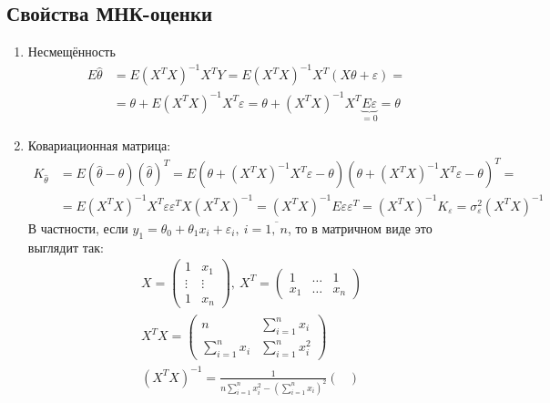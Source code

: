 \documentclass[12pt, a4paper]{article}
\begin{document}
\subsection*{Свойства МНК-оценки}
\begin{enumerate}
    \item Несмещённость
    \[
    \begin{aligned}
        E \hat \theta &= E \left( X^T X \right)^{-1} X^T Y = E \left( X^T X \right)^{-1} X^T (X\theta + \varepsilon) =\\
        & = \theta + E\left( X^T X \right)^{-1} X^T \varepsilon = \theta + \left( X^T X \right)^{-1} X^T \underset{=0}{\underbrace{E\varepsilon}} = \theta
    \end{aligned}
    \]
    \item Ковариационная матрица:
    \[
    \begin{aligned}
        K_{\hat \theta} &= E\left(\hat \theta - \theta \right) \left( \hat \theta \right)^T = E\left( \theta + \left( X^T X \right)^{-1} X^T \varepsilon - \theta \right) \left( \theta + \left( X^T X \right)^{-1} X^T \varepsilon - \theta \right)^T =\\
        & =E \left( X^T X \right)^{-1} X^T \varepsilon \varepsilon^T X (X^T X)^{-1} = \left( X^T X \right)^{-1} E\varepsilon \varepsilon^T = \left( X^T X \right)^{-1} K_{\varepsilon} = \sigma_{\varepsilon}^2 \left( X^T X \right)^{-1}
    \end{aligned}
    \]
    В частности, если $y_1 = \theta_0 + \theta_1 x_i + \varepsilon_i,\ i = \overline{1,\ n}$, то в матричном виде это выглядит так:
    \[
    \begin{aligned}
        & X = \begin{pmatrix}
            1 & x_1\\
            \vdots & \vdots\\
            1 & x_n
        \end{pmatrix},\ X^T = \begin{pmatrix}
            1 & \dots & 1\\
            x_1 & \dots & x_n
        \end{pmatrix}\\
        & X^T X = \begin{pmatrix}
            n & \sum_{i = 1}^{n} x_i\\
            \sum_{i = 1}^{n} x_i & \sum_{i = 1}^{n} x_i^2
        \end{pmatrix}\\
        & \left( X^T X \right)^{-1} = \frac{1}{n \sum_{i = 1}^{n} x_i^2 - \left( \sum_{i = 1}^{n} x_i \right)^2} \begin{pmatrix}

\end{pmatrix}
\end{aligned}\]
\end{enumerate}
\end{document}
